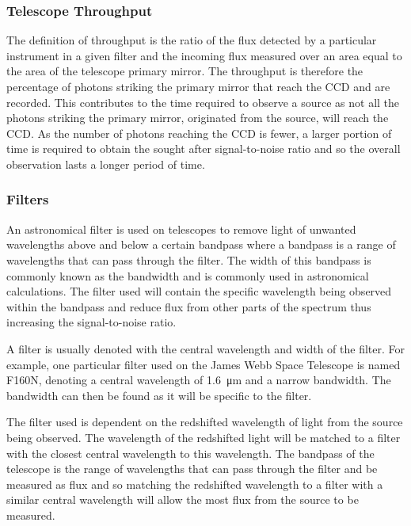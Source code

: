 		\subsubsection{Telescope Throughput} %
		\label{ssub:telescope_throughput}
			The definition of throughput is the ratio of the flux detected by a particular instrument in a given filter and the incoming flux measured over an area equal to the area of the telescope primary mirror\cite{WIRCam_Throughput}. The throughput is therefore the percentage of photons striking the primary mirror that reach the CCD and are recorded. This contributes to the time required to observe a source as not all the photons striking the primary mirror, originated from the source, will reach the CCD. As the number of photons reaching the CCD is fewer, a larger portion of time is required to obtain the sought after signal-to-noise ratio and so the overall observation lasts a longer period of time.

		\subsubsection{Filters} %
		\label{ssub:filters}
			An astronomical filter is used on telescopes to remove light of unwanted wavelengths above and below a certain bandpass where a bandpass is a range of wavelengths that can pass through the filter. The width of this bandpass is commonly known as the bandwidth and is commonly used in astronomical calculations. The filter used will contain the specific wavelength being observed within the bandpass and reduce flux from other parts of the spectrum thus increasing the signal-to-noise ratio.

			A filter is usually denoted with the central wavelength and width of the filter. For example, one particular filter used on the James Webb Space Telescope is named F160N, denoting a central wavelength of \SI{1.6}{\micro\metre} and a narrow bandwidth. The bandwidth can then be found as it will be specific to the filter.

			The filter used is dependent on the redshifted wavelength of light from the source being observed. The wavelength of the redshifted light will be matched to a filter with the closest central wavelength to this wavelength. The bandpass of the telescope is the range of wavelengths that can pass through the filter and be measured as flux and so matching the redshifted wavelength to a filter with a similar central wavelength will allow the most flux from the source to be measured.

